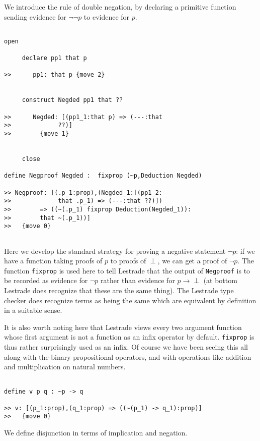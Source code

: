 \documentclass[12pt]{article}
\begin{document}
We introduce the rule of double negation, by declaring a primitive function sending evidence for $\neg\neg p$ to evidence for $p$.

\begin{verbatim}

open

     declare pp1 that p

>>      pp1: that p {move 2}


     construct Negded pp1 that ??

>>      Negded: [(pp1_1:that p) => (---:that 
>>             ??)]
>>        {move 1}


     close

define Negproof Negded :  fixprop (~p,Deduction Negded)

>> Negproof: [(.p_1:prop),(Negded_1:[(pp1_2:
>>             that .p_1) => (---:that ??)])
>>        => ((~(.p_1) fixprop Deduction(Negded_1)):
>>        that ~(.p_1))]
>>   {move 0}


\end{verbatim}

Here we develop the standard strategy for proving a negative statement $\neg p$:  if we have a function taking proofs of $p$ to proofs of $\perp$, we can get a proof
of $\neg p$.  The function {\tt fixprop} is used here to tell Lestrade that the output of {\tt Negproof} is to be recorded as evidence for $\neg p$ rather than evidence for
$p \rightarrow \perp$ (at bottom Lestrade does recognize that these are the same thing).  The Lestrade type checker does recognize terms as being the same which are equivalent by definition in a suitable sense.

It is also worth noting here that Lestrade views every two argument function whose first argument is not a function as an infix operator by default.   {\tt fixprop} is thus rather surprisingly used as an infix.  Of course we have been seeing this all along with the binary propositional operators, and with operations like addition and multiplication on natural numbers.


\begin{verbatim}

define v p q : ~p -> q

>> v: [(p_1:prop),(q_1:prop) => ((~(p_1) -> q_1):prop)]
>>   {move 0}

\end{verbatim}

We define disjunction in terms of implication and negation.
\end{document}
